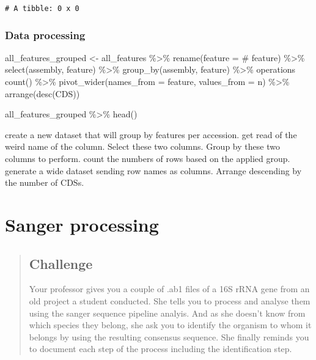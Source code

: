 \documentclass[
  letterpaper,
  DIV=11,
  numbers=noendperiod]{scrreprt}
\newenvironment{Shaded}{\begin{snugshade}}{\end{snugshade}}
\newcommand{\AttributeTok}[1]{\textcolor[rgb]{0.40,0.46,0.14}{#1}}
\newcommand{\FunctionTok}[1]{\textcolor[rgb]{0.28,0.35,0.67}{#1}}
\newcommand{\NormalTok}[1]{\textcolor[rgb]{0.00,0.46,0.62}{#1}}
\newcommand{\OtherTok}[1]{\textcolor[rgb]{0.00,0.46,0.62}{#1}}
\newcommand{\SpecialCharTok}[1]{\textcolor[rgb]{0.37,0.37,0.37}{#1}}
\newcommand{\StringTok}[1]{\textcolor[rgb]{0.13,0.47,0.30}{#1}}
\begin{document}
\begin{verbatim}
# A tibble: 0 x 0
\end{verbatim}

\hypertarget{data-processing}{%
\subsection*{Data processing}\label{data-processing}}

\begin{Shaded}
\begin{Highlighting}[]
\NormalTok{all\_features\_grouped }\OtherTok{\textless{}{-}}\NormalTok{ all\_features }\SpecialCharTok{\%\textgreater{}\%} 
  \FunctionTok{rename}\NormalTok{(}\AttributeTok{feature =} \StringTok{\textasciigrave{}}\AttributeTok{\# feature}\StringTok{\textasciigrave{}}\NormalTok{) }\SpecialCharTok{\%\textgreater{}\%} 
  \FunctionTok{select}\NormalTok{(assembly, feature) }\SpecialCharTok{\%\textgreater{}\%} 
  \FunctionTok{group\_by}\NormalTok{(assembly, feature) }\SpecialCharTok{\%\textgreater{}\%}\NormalTok{  operations}
  \FunctionTok{count}\NormalTok{() }\SpecialCharTok{\%\textgreater{}\%} 
  \FunctionTok{pivot\_wider}\NormalTok{(}\AttributeTok{names\_from =}\NormalTok{ feature, }\AttributeTok{values\_from =}\NormalTok{ n) }\SpecialCharTok{\%\textgreater{}\%} 
  \FunctionTok{arrange}\NormalTok{(}\FunctionTok{desc}\NormalTok{(CDS))}
    
\NormalTok{all\_features\_grouped }\SpecialCharTok{\%\textgreater{}\%} 
  \FunctionTok{head}\NormalTok{()}
\end{Highlighting}
\end{Shaded}

create a new dataset that will group by features per accession. get read
of the weird name of the column. Select these two columns. Group by
these two columns to perform. count the numbers of rows based on the
applied group. generate a wide dataset sending row names as columns.
Arrange descending by the number of CDSs.

\hypertarget{sanger-processing}{%
\chapter{Sanger processing}\label{sanger-processing}}

\begin{quote}
\hypertarget{challenge-1}{%
\section*{Challenge}\label{challenge-1}}

Your professor gives you a couple of .ab1 files of a 16S rRNA gene from
an old project a student conducted. She tells you to process and analyse
them using the sanger sequence pipeline analyis. And as she doesn't know
from which species they belong, she ask you to identify the organism to
whom it belongs by using the resulting consensus sequence. She finally
reminds you to document each step of the process including the
identification step.
\end{quote}
\end{document}
